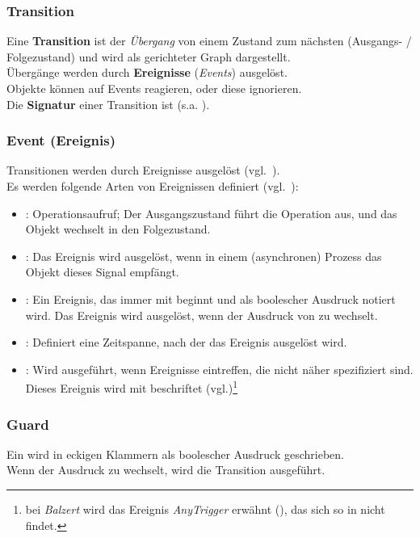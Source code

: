 \subsubsection*{Transition}
Eine \textbf{Transition} ist der \textit{Übergang} von einem Zustand zum nächsten (Ausgangs- / Folgezustand) und wird als gerichteter Graph dargestellt.\\

\noindent
Übergänge werden durch \textbf{Ereignisse} (\textit{Events}) ausgelöst.\\
Objekte können auf Events reagieren, oder diese ignorieren.\\

\noindent
Die \textbf{Signatur} einer Transition ist  (s.a. \cite[321]{OMG17}).

\subsubsection*{Event (Ereignis)}
Transitionen werden durch Ereignisse ausgelöst (vgl.~\cite[91]{Bal05}).\\
Es werden folgende Arten von Ereignissen definiert (vgl.~\cite[69]{Buh09}):

\begin{itemize}
    \item {}: Operationsaufruf; Der Ausgangszustand führt die Operation aus, und das Objekt wechselt in den Folgezustand.
    \item {}: Das Ereignis wird ausgelöst, wenn in einem (asynchronen) Prozess das Objekt dieses Signal empfängt.
    \item {}: Ein Ereignis, das immer mit  beginnt und als boolescher Ausdruck notiert wird. Das Ereignis wird ausgelöst, wenn der Ausdruck von  zu  wechselt.
    \item {}: Definiert eine Zeitspanne, nach der das Ereignis ausgelöst wird.
    \item {}: Wird ausgeführt, wenn Ereignisse eintreffen, die nicht näher spezifiziert sind. Dieses Ereignis wird mit  beschriftet (vgl.\cite[293]{OMG17})\footnote{bei \textit{Balzert} wird das Ereignis \textit{AnyTrigger} erwähnt (\cite[91]{Bal05}), das sich so in \cite{OMG17} nicht findet.}
\end{itemize}

\subsubsection*{Guard}
Ein  wird in eckigen Klammern als boolescher Ausdruck geschrieben.\\
Wenn der Ausdruck zu  wechselt, wird die Transition ausgeführt.

